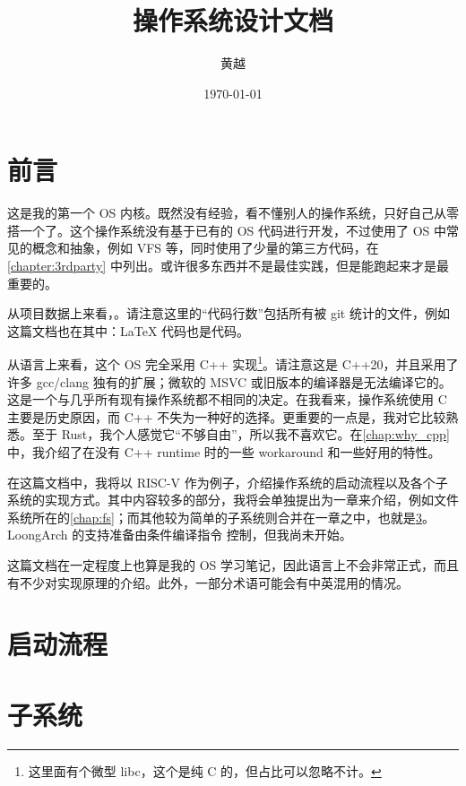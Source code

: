 



\title{操作系统设计文档}
\author{黄越}
\date{\today}
\maketitle
\newpage

\tableofcontents

\chapter{前言}
\label{chap:preface}

这是我的第一个 OS 内核。既然没有经验，看不懂别人的操作系统，只好自己从零搭一个了。这个操作系统没有基于已有的 OS 代码进行开发，不过使用了 OS 中常见的概念和抽象，例如 VFS 等，同时使用了少量的第三方代码，在 \cref{chapter:3rdparty} 中列出。或许很多东西并不是最佳实践，但是能跑起来才是最重要的。

从项目数据上来看，。请注意这里的“代码行数”包括所有被 git 统计的文件，例如这篇文档也在其中：LaTeX 代码也是代码。

从语言上来看，这个 OS 完全采用 C++ 实现\footnote{这里面有个微型 libc，这个是纯 C 的，但占比可以忽略不计。}。请注意这是 C++20，并且采用了许多 gcc/clang 独有的扩展；微软的 MSVC 或旧版本的编译器是无法编译它的。这是一个与几乎所有现有操作系统都不相同的决定。在我看来，操作系统使用 C 主要是历史原因，而 C++ 不失为一种好的选择。更重要的一点是，我对它比较熟悉。至于 Rust，我个人感觉它“不够自由”，所以我不喜欢它。在\cref{chap:why_cpp}中，我介绍了在没有 C++ runtime 时的一些 workaround 和一些好用的特性。

在这篇文档中，我将以 RISC-V 作为例子，介绍操作系统的启动流程以及各个子系统的实现方式。其中内容较多的部分，我将会单独提出为一章来介绍，例如文件系统所在的\cref{chap:fs}；而其他较为简单的子系统则合并在一章之中，也就是\cref{chap:subsystem}。LoongArch 的支持准备由条件编译指令  控制，但我尚未开始。

这篇文档在一定程度上也算是我的 OS 学习笔记，因此语言上不会非常正式，而且有不少对实现原理的介绍。此外，一部分术语可能会有中英混用的情况。

\chapter{启动流程}
\label{chap:boot}


\chapter{子系统}
\label{chap:subsystem}





